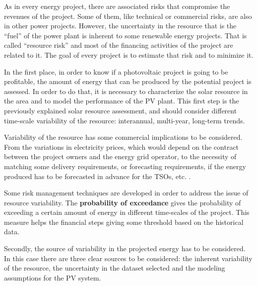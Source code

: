 As in every energy project, there are associated risks that compromise the revenues of the project. Some of them, like technical or commercial risks, are also in other power projects. However, the uncertainty in the resource that is the ``fuel'' of the power plant is inherent to some renewable energy projects. That is called ``resource risk'' and most of the financing activities of the project are related to it. The goal of every project is to estimate that risk and to minimize it.

In the first place, in order to know if a photovoltaic project is going to be profitable, the amount of energy that can be produced by the potential project is assessed. In order to do that, it is necessary to characterize the solar resource in the area and to model the performance of the PV plant. This first step is the previously explained solar resource assessment,  and should consider different time-scale variability of the resource: interannual, multi-year, long-term trends. 
 


Variability of the resource has some commercial implications to be considered. From the variations in electricity prices, which would depend on the contract between the project owners and the energy grid operator, to the necessity of matching some delivery requirements, or forecasting requirements, if the energy produced has to be forecasted in advance for the TSOs, etc. \cite*{MCMAHAN201381}.

Some risk management techniques are developed in order to address the issue of resource variability. The \textbf{probability of exceedance} gives the probability of exceeding a certain amount of energy in different time-scales of the project. This measure helps the financial steps giving some threshold based on the historical data.

Secondly, the source of variability in the projected energy has to be considered. In this case there are three clear sources to be considered: the inherent variability of the resource, the uncertainty in the dataset selected and the modeling assumptions for the PV system.


